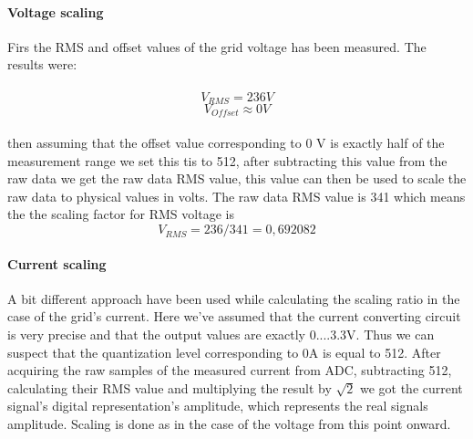 \paragraph{Voltage scaling}
Firs the RMS and offset values of the grid voltage has been measured. The results were:\\\\ 
\[ V_{RMS}=236V \] 
\[ V_{Offset} \approx 0V\]\\
then assuming that the offset value corresponding to 0 V is exactly half of the measurement range we set this tis to 512, after subtracting this value from the raw data we get the raw data RMS value, this value can then be used to scale the raw data to physical values in volts. The raw data RMS value is 341 which means the the scaling factor for RMS voltage is
\[ V_{RMS}= 236/341=0,692082\]

\paragraph{Current scaling}
A bit different approach have been used while calculating the scaling ratio in the case of the grid's current. Here we've assumed that the current converting circuit is very precise and that the output values are exactly 0....3.3V. Thus we can suspect that the quantization level corresponding to 0A is equal to 512. After acquiring the raw samples of the measured current from ADC, subtracting 512, calculating their RMS value and multiplying the result by $ \sqrt{2} $ we got the current signal's digital representation's amplitude, which represents the real signals amplitude. Scaling is done as in the case of the voltage from this point onward.

